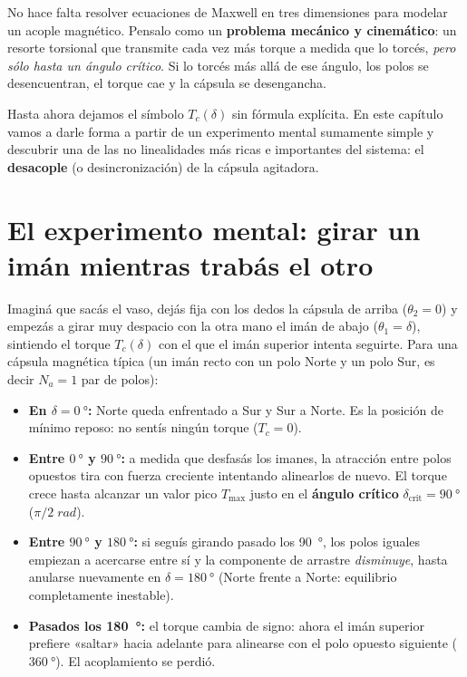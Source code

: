 \documentclass[11pt,a4paper,oneside]{book}
\begin{document}
\begin{ideafisica}
No hace falta resolver ecuaciones de Maxwell en tres dimensiones para modelar un
acople magnético. Pensalo como un \textbf{problema mecánico y cinemático}: un
resorte torsional que transmite cada vez más torque a medida que lo torcés,
\emph{pero sólo hasta un ángulo crítico}. Si lo torcés más allá de ese ángulo,
los polos se desencuentran, el torque cae y la cápsula se desengancha.
\end{ideafisica}

Hasta ahora dejamos el símbolo $T_c(\delta)$ sin fórmula explícita. En este
capítulo vamos a darle forma a partir de un experimento mental sumamente simple
y descubrir una de las no linealidades más ricas e importantes del sistema: el
\textbf{desacople} (o desincronización) de la cápsula agitadora.

\section{El experimento mental: girar un imán mientras trabás el otro}

Imaginá que sacás el vaso, dejás fija con los dedos la cápsula de arriba
($\theta_2 = 0$) y empezás a girar muy despacio con la otra mano el imán de
abajo ($\theta_1 = \delta$), sintiendo el torque $T_c(\delta)$ con el que el
imán superior intenta seguirte. Para una cápsula magnética típica (un imán
recto con un polo Norte y un polo Sur, es decir $N_a = 1$ par de polos):
\begin{itemize}
  \item \textbf{En $\delta = \SI{0}{\degree}$:} Norte queda enfrentado a Sur y
        Sur a Norte. Es la posición de mínimo reposo: no sentís ningún torque
        ($T_c = 0$).
  \item \textbf{Entre $\SI{0}{\degree}$ y $\SI{90}{\degree}$:} a medida que
        desfasás los imanes, la atracción entre polos opuestos tira con fuerza
        creciente intentando alinearlos de nuevo. El torque crece hasta alcanzar
        un valor pico $T_{\max}$ justo en el \textbf{ángulo crítico}
        $\delta_{\text{crit}} = \SI{90}{\degree}$ ($\pi/2\;\si{rad}$).
  \item \textbf{Entre $\SI{90}{\degree}$ y $\SI{180}{\degree}$:} si seguís
        girando pasado los \SI{90}{\degree}, los polos iguales empiezan a
        acercarse entre sí y la componente de arrastre \emph{disminuye}, hasta
        anularse nuevamente en $\delta = \SI{180}{\degree}$ (Norte frente a
        Norte: equilibrio completamente inestable).
  \item \textbf{Pasados los \SI{180}{\degree}:} el torque cambia de signo: ahora
        el imán superior prefiere «saltar» hacia adelante para alinearse con el
        polo opuesto siguiente ($\SI{360}{\degree}$). El acoplamiento se perdió.
\end{itemize}
\end{document}
